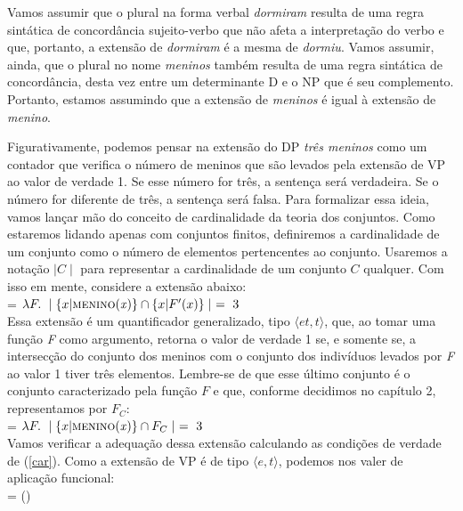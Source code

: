 \n Vamos assumir que o plural na forma verbal \textit{dormiram}
resulta de uma regra sintática de concordância sujeito-verbo que
não afeta a interpretação do verbo e que, portanto, a extensão de
\textit{dormiram} é a mesma de \textit{dormiu}. Vamos assumir, ainda, que o plural no nome \textit{meninos} também resulta de uma
regra sintática de concordância, desta vez entre um determinante D e
o NP que é seu complemento. Portanto, estamos assumindo que a
extensão de \textit{meninos} é igual à extensão de
\textit{menino}.

Figurativamente, podemos pensar na extensão do DP \textit{três
meninos} como um contador que verifica o número de meninos que são
levados pela extensão de VP ao valor de verdade 1. Se esse número
for três, a sentença será verdadeira. Se o número for diferente de
três, a sentença será falsa. Para formalizar essa ideia, vamos
lançar mão do conceito de cardinalidade da teoria dos conjuntos.
Como estaremos lidando apenas com conjuntos finitos, definiremos a
cardinalidade de um conjunto como o número de elementos
pertencentes ao conjunto. Usaremos a notação $\mid C \mid$ para
representar a cardinalidade de um conjunto $C$ qualquer. Com isso em
mente, considere a extensão abaixo:\\

\n {} = $\lambda F.\ \mid\{x | \text{\textsc{menino}(\textit{x})}\}\cap\{x | F'(x)\}\mid\ =\ 3$\\

\n Essa extensão é um quantificador generalizado, tipo $\langle
et,t\rangle$, que, ao tomar uma função \textit{F} como argumento,
retorna o valor de verdade 1 se, e somente se, a intersecção do
conjunto dos meninos com o conjunto dos indivíduos levados por
\textit{F} ao valor 1 tiver três elementos. Lembre-se de que esse último conjunto é o conjunto caracterizado pela função $F$ e que, conforme decidimos no capítulo 2, representamos por $F_{C}$:\\

\n {} = $\lambda F.\ \mid\{x | \text{\textsc{menino}(\textit{x})}\}\cap F_{C}\mid\ =\ 3$\\


\n Vamos verificar a
adequação dessa extensão calculando as condições de verdade de
(\ref{car}). Como a extensão de VP é de tipo $\langle e,t\rangle$,
podemos nos valer de aplicação funcional:\\

\n {} = ()\\

